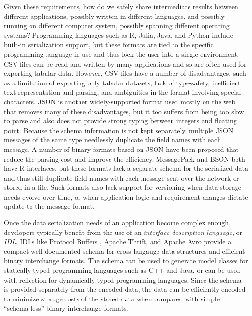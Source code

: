 \documentclass[article]{jss}
\begin{document}
Given these requirements, how do we safely share intermediate results
between different applications, possibly written in different
languages, and possibly running on different computer system, possibly
spanning different operating systems?  Programming
languages such as R, Julia, Java, and Python include built-in
serialization support, but these formats are tied to the specific
programming language in use and thus lock the user into a single
environment.  CSV files can be read and written by many applications
and so are often used for exporting tabular data.  However, CSV files
have a number of disadvantages, such as a limitation of exporting only
tabular datasets, lack of type-safety, inefficient text representation
and parsing, and ambiguities in the format involving special
characters.  JSON is another widely-supported format used mostly on
the web that removes many of these disadvantages, but it too suffers
from being too slow to parse and also does not provide strong typing
between integers and floating point.  Because the schema information
is not kept separately, multiple JSON messages of the same type
needlessly duplicate the field names with each message.
%
%
%
A number of binary formats based on JSON have been proposed that
reduce the parsing cost and improve the efficiency.  MessagePack
\citep{msgpackR} and BSON \citep{rmongodb} both have R interfaces, but
these formats lack a separate schema for the serialized data and thus
still duplicate field names with each message sent over the network or
stored in a file.  Such formats also lack support for versioning when
data storage needs evolve over time, or when application logic and
requirement changes dictate update to the message format.

Once the data serialization needs of an application become complex
enough, developers typically benefit from the use of an
\emph{interface description language}, or \emph{IDL}.  IDLs like
Protocol Buffers \citep{protobuf}, Apache Thrift, and Apache Avro provide a compact
well-documented schema for cross-langauge data structures and
efficient binary interchange formats.  The schema can be used to
generate model classes for statically-typed programming languages such
as C++ and Java, or can be used with reflection for dynamically-typed
programming languages.  Since the schema is provided separately from
the encoded data, the data can be efficiently encoded to minimize
storage costs of the stored data when compared with simple
``schema-less'' binary interchange formats.
\end{document}
